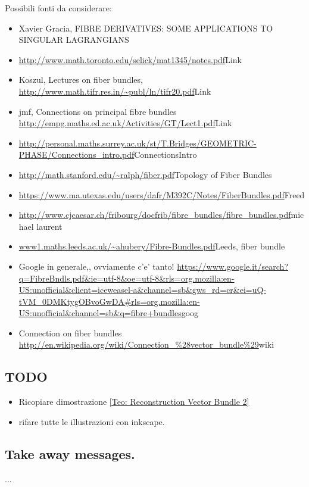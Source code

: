 \documentclass[a4paper,12pt]{scrartcl}    %
\begin{document}
\vspace{8mm}
Possibili fonti da considerare:
\begin{itemize}
	\item Xavier Gracia, FIBRE DERIVATIVES: SOME APPLICATIONS TO SINGULAR LAGRANGIANS 
	\item \url{http://www.math.toronto.edu/selick/mat1345/notes.pdf}{Link}
	\item Koszul, Lectures on fiber bundles, \url{http://www.math.tifr.res.in/~publ/ln/tifr20.pdf}{Link}
	\item jmf, Connections on principal fibre bundles \url{http://empg.maths.ed.ac.uk/Activities/GT/Lect1.pdf}{Link}
	\item \url{http://personal.maths.surrey.ac.uk/st/T.Bridges/GEOMETRIC-PHASE/Connections_intro.pdf}{ConnectionsIntro}
	\item \url{http://math.stanford.edu/~ralph/fiber.pdf}{Topology of Fiber Bundles}
	\item \url{https://www.ma.utexas.edu/users/dafr/M392C/Notes/FiberBundles.pdf}{Freed}
	\item \url{http://www.cjcaesar.ch/fribourg/docfrib/fibre_bundles/fibre_bundles.pdf}{michael laurent}
	\item \url{www1.maths.leeds.ac.uk/~ahubery/Fibre-Bundles.pdf}{Leeds, fiber bundle}
	\item Google in generale,, ovviamente c'e' tanto! \url{https://www.google.it/search?q=FibreBndls.pdf&ie=utf-8&oe=utf-8&rls=org.mozilla:en-US:unofficial&client=iceweasel-a&channel=sb&gws_rd=cr&ei=uQ-tVM_0DMKtygOBvoGwDA#rls=org.mozilla:en-US:unofficial&channel=sb&q=fibre+bundles}{goog}	
	\item Connection on fiber bundles \url{http://en.wikipedia.org/wiki/Connection_%28vector_bundle%29}{wiki}	
	
\end{itemize}

\subsection{TODO}
\begin{itemize}
\item Ricopiare dimostrazione \ref{Teo: Reconstruction Vector Bundle 2}

\item rifare tutte le illustrazioni con inkscape.
\end{itemize}

\subsection{Take away messages.}
	...



\end{document}
